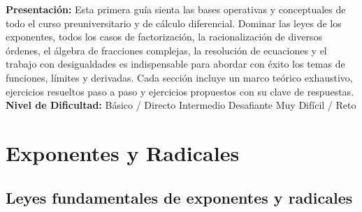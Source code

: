 \documentclass[12pt, letterpaper]{article}
\begin{document}

\vspace{4pt}
\begin{cuadroinfo}
      \small
      \textbf{Presentación:} Esta primera guía sienta las bases operativas y conceptuales de todo el curso preuniversitario y de cálculo diferencial. Dominar las leyes de los exponentes, todos los casos de factorización, la racionalización de diversos órdenes, el álgebra de fracciones complejas, la resolución de ecuaciones y el trabajo con desigualdades es indispensable para abordar con éxito los temas de funciones, límites y derivadas. Cada sección incluye un marco teórico exhaustivo, ejercicios resueltos paso a paso y ejercicios propuestos con su clave de respuestas.
      \\[4pt]
      \textbf{Nivel de Dificultad:}\quad
      \facil{} Básico / Directo \quad
      \medio{} Intermedio \quad
      \dificil{} Desafiante \quad
      \muyDificil{} Muy Difícil / Reto
\end{cuadroinfo}

\vspace{8pt}
\newpage
\section{Exponentes y Radicales}

\subsection{Leyes fundamentales de exponentes y radicales}
\end{document}
